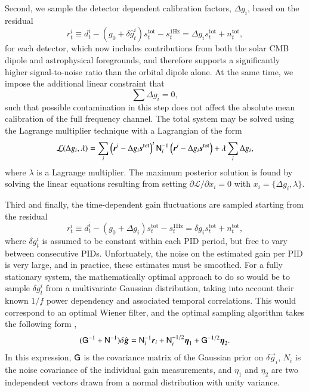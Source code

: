 \documentclass[twocolumn]{aa}
\newcommand{\s}[0]{\vec{s}}
\newcommand{\g}[0]{\vec{g}}
\newcommand{\N}[0]{\tens{N}}
\renewcommand{\r}[0]{\vec{r}}
\begin{document}
Second, we sample the detector dependent calibration factors, $\Delta
g_i$, based on the residual
\begin{equation}
  r^i_t \equiv d^i_{t} - (g_0 + \delta \hat{g}_t^i) s^{\mathrm{tot}}_{t}  - s^{\mathrm{1Hz}}_t
  =  \Delta g_i s^{\mathrm{tot}}_{t} + n^{\mathrm{tot}}_{t},
  \label{eq:g0_res}
\end{equation}
for each detector, which now includes contributions from both the
solar CMB dipole and astrophysical foregrounds, and therefore supports
a significantly higher signal-to-noise ratio than the orbital dipole
alone. At the same time, we impose the additional linear constraint that
\begin{equation}
  \sum \Delta g_i = 0,
\end{equation}
such that possible contamination in this step does not affect the
absolute mean calibration of the full frequency channel. The total
system may be solved using the Lagrange multiplier technique
\citep[e.g.,][]{bertsekas:1996} with a Lagrangian of the form
\begin{equation}
\mathcal{L}(\Delta g_i, \lambda) = \sum_i \left(\r^{i}-\Delta g_i
\s^{\mathrm{tot}}\right)^t \N_i^{-1} \left(\r^{i}-\Delta g_i \s^{\mathrm{tot}}\right) +
\lambda \sum_i \Delta g_i,
\end{equation}
where $\lambda$ is a Lagrange multiplier. The maximum posterior
solution is found by solving the linear equations resulting from setting
$\partial \mathcal{L}/\partial x_i = 0$ with $x_i = \{\Delta g_i,
\lambda\}$. 


Third and finally, the time-dependent gain fluctuations are sampled
starting from the residual 
\begin{equation}
  r^i_t \equiv d^i_{t} - \left(g_0 + \Delta g_i\right) s^{\mathrm{tot}}_{t} - s^{\mathrm{1Hz}}_t
 =  \delta g_i s^{\mathrm{tot}}_{t} + n^{\mathrm{tot}}_{t},
\end{equation}
where $\delta g^i_t$ is assumed to be constant within each PID period,
but free to vary between consecutive PIDs. Unfortuately, the noise on
the estimated gain per PID is very large, and in practice, these
estimates must be smoothed. For a fully stationary system, the
mathematically optimal approach to do so would be to sample $\delta
g^i_t$ from a multivariate Gaussian distribution, taking into account
their known $1/f$ power dependency and associated temporal
correlations. This would correspond to an optimal Wiener filter, and
the optimal sampling algorithm takes the following form \citep{bp07},
\newcommand{\tG}[0]{\tens{G}}
\begin{equation}
    (\tG^{-1} + \N^{-1})\delta \hat{\g} = \N_i^{-1}\r_i + \N_i^{-1/2}\vec\eta_1 + \tG^{-1/2}\vec\eta_2.
    \label{eq:delta_gain_sampling_with_prior}
\end{equation}
In this expression, $\tG$ is the covariance matrix of the Gaussian
prior on $\delta\g_i$, $N_i$ is the noise covariance of the individual
gain measurements, and $\eta_1$ and $\eta_2$ are two independent
vectors drawn from a normal distribution with unity
variance.
\end{document}
